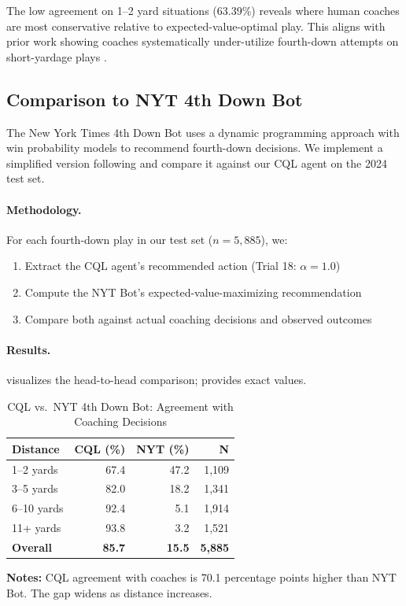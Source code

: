 The low agreement on 1--2 yard situations (63.39\%) reveals where human coaches are most conservative relative to expected-value-optimal play. This aligns with prior work showing coaches systematically under-utilize fourth-down attempts on short-yardage plays \citep{romer2006}.

\subsection{Comparison to NYT 4th Down Bot}

The New York Times 4th Down Bot \citep{nyt4thdown} uses a dynamic programming approach with win probability models to recommend fourth-down decisions. We implement a simplified version following \citet{burke2009} and compare it against our CQL agent on the 2024 test set.

\paragraph{Methodology.}
For each fourth-down play in our test set ($n=5,885$), we:
\begin{enumerate}
    \item Extract the CQL agent's recommended action (Trial 18: $\alpha=1.0$)
    \item Compute the NYT Bot's expected-value-maximizing recommendation
    \item Compare both against actual coaching decisions and observed outcomes
\end{enumerate}

\paragraph{Results.}
 visualizes the head-to-head comparison;  provides exact values.



\begin{table}[h]
\centering
\caption{CQL vs.\ NYT 4th Down Bot: Agreement with Coaching Decisions}
\label{tab:cql-nyt-comparison}
\begin{tabular}{@{}lrrr@{}}
\toprule
\textbf{Distance} & \textbf{CQL (\%)} & \textbf{NYT (\%)} & \textbf{N} \\
\midrule
1--2 yards & 67.4 & 47.2 & 1,109 \\
3--5 yards & 82.0 & 18.2 & 1,341 \\
6--10 yards & 92.4 & 5.1 & 1,914 \\
11+ yards & 93.8 & 3.2 & 1,521 \\
\midrule
\textbf{Overall} & \textbf{85.7} & \textbf{15.5} & \textbf{5,885} \\
\bottomrule
\end{tabular}
\begin{tablenotes}
\small
\item \textbf{Notes:} CQL agreement with coaches is 70.1 percentage points higher than NYT Bot. The gap widens as distance increases.
\end{tablenotes}
\end{table}

